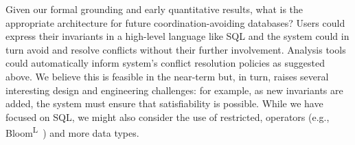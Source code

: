  Given our formal grounding and early
quantitative results, what is the appropriate architecture for future
coordination-avoiding databases? Users could express their invariants
in a high-level language like SQL and the system could in turn avoid
and resolve conflicts without their further involvement. Analysis
tools could automatically inform system's conflict resolution policies
as suggested above. We believe this is feasible in the near-term but,
in turn, raises several interesting design and engineering challenges:
for example, as new invariants are added, the system must ensure that
satisfiability is possible. While we have focused on SQL, we might
also consider the use of restricted, \iconfluent operators (e.g.,
Bloom\textsuperscript{L}~\cite{blooml}) and more data types.

